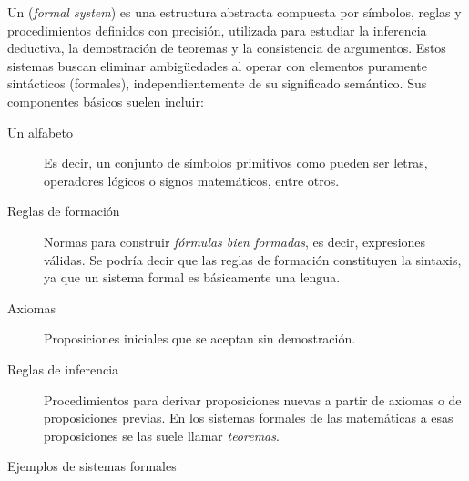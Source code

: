 



Un  (\emph{formal system}) es una estructura abstracta
compuesta por símbolos, reglas y procedimientos definidos con precisión,
utilizada para estudiar la inferencia deductiva, la demostración de teoremas
y la consistencia de argumentos. Estos sistemas buscan eliminar ambigüedades
al operar con elementos puramente sintácticos (formales), independientemente
de su significado semántico. Sus componentes básicos suelen incluir:

\begin{description}
  \item[Un alfabeto] Es decir, un conjunto de símbolos primitivos como
    pueden ser letras, operadores lógicos o signos matemáticos, entre otros.
  \item[Reglas de formación] Normas para construir \emph{fórmulas bien
    formadas}, es decir, expresiones válidas. Se podría decir que las reglas
    de formación constituyen la sintaxis, ya que un sistema formal es
    básicamente una lengua.
  \item[Axiomas] Proposiciones iniciales que se aceptan sin demostración.
  \item[Reglas de inferencia] Procedimientos para derivar proposiciones
    nuevas a partir de axiomas o de proposiciones previas. En los sistemas
    formales de las matemáticas a esas proposiciones se las suele llamar
    \emph{teoremas}.
\end{description}

Ejemplos de sistemas formales

